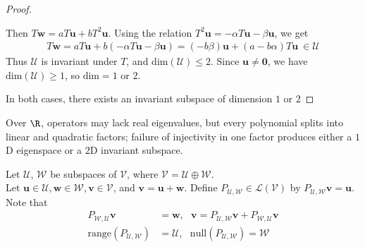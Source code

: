 \begin{theorem}
\begin{proof}
\begin{enumerate}[label=\roman*.]
Then $T \mathbf{w} = a T \mathbf{u} + b T^2 \mathbf{u}$. Using the relation $T^2 \mathbf{u} = -\alpha T \mathbf{u} - \beta \mathbf{u}$, we get
\begin{align}
T \mathbf{w} = a T \mathbf{u} + b(- \alpha T \mathbf{u} - \beta \mathbf{u}) = (-b \beta)\mathbf{u} + (a - b \alpha)T \mathbf{u} \ \in \mathcal{U} \nonumber
\end{align}
Thus $\mathcal{U}$ is invariant under $T$, and $\text{dim}(\mathcal{U}) \leq 2$. Since $\mathbf{u} \neq \mathbf{0}$, we have $\text{dim}(\mathcal{U}) \geq 1$, so $\text{dim} = 1$ or $2$.
\end{enumerate}
In both cases, there exists an invariant subspace of dimension $1$ or $2$
\end{proof}
\end{theorem}

Over $\R$, operators may lack real eigenvalues, but every polynomial splits into linear and quadratic factors; failure of injectivity in one factor produces either a $1$D eigenspace or a $2$D invariant subspace.

\begin{definition} Let $\mathcal{U}$, $\mathcal{W}$ be subspaces of $\mathcal{V}$, where $\mathcal{V} = \mathcal{U} \oplus \mathcal{W}$.\\
Let $\mathbf{u} \in \mathcal{U}, \mathbf{w} \in \mathcal{W}, \mathbf{v} \in \mathcal{V}$, and $\mathbf{v} = \mathbf{u} + \mathbf{w}$. Define  $P_{\mathcal{U}, \mathcal{W}} \in \mathcal{L}(\mathcal{V})$ by $P_{\mathcal{U}, \mathcal{W}} \mathbf{v} = \mathbf{u}$. Note that
\begin{align}
P_{\mathcal{W}, \mathcal{U}} \mathbf{v} &= \mathbf{w}, \ \ \ \mathbf{v} = P_{\mathcal{U}, \mathcal{W}} \mathbf{v} + P_{\mathcal{W}, \mathcal{U}} \mathbf{v} \nonumber \\
\text{range} (P_{\mathcal{U}, \mathcal{W}}) &= \mathcal{U}, \ \ \ \text{null}(P_{\mathcal{U}, \mathcal{W}}) = \mathcal{W} \nonumber
\end{align}
\end{definition}

